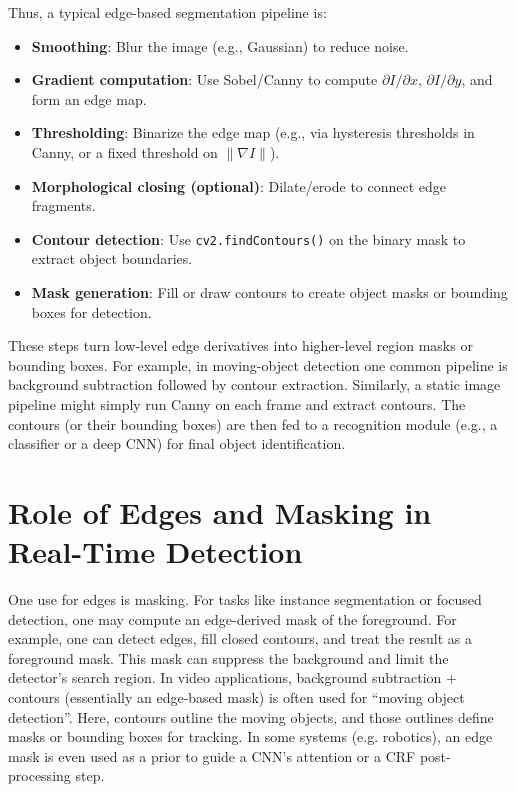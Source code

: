 \documentclass[12pt]{article}
\begin{document}
Thus, a typical edge-based segmentation pipeline is:
\begin{itemize}
\item \textbf{Smoothing}: Blur the image (e.g., Gaussian) to reduce noise.
\item \textbf{Gradient computation}: Use Sobel/Canny to compute $\partial I / \partial x$, $\partial I / \partial y$, and form an edge map.
\item \textbf{Thresholding}: Binarize the edge map (e.g., via hysteresis thresholds in Canny, or a fixed threshold on $\| \nabla I \|$).
\item \textbf{Morphological closing (optional)}: Dilate/erode to connect edge fragments.
\item \textbf{Contour detection}: Use \texttt{cv2.findContours()} on the binary mask to extract object boundaries.
\item \textbf{Mask generation}: Fill or draw contours to create object masks or bounding boxes for detection.
\end{itemize}

These steps turn low-level edge derivatives into higher-level region masks or bounding boxes. For example, in moving-object detection one common pipeline is background subtraction followed by contour extraction. Similarly, a static image pipeline might simply run Canny on each frame and extract contours. The contours (or their bounding boxes) are then fed to a recognition module (e.g., a classifier or a deep CNN) for final object identification.

\section{Role of Edges and Masking in Real-Time Detection}
One use for edges is masking. For tasks like instance segmentation or focused detection, one may compute an edge-derived mask of the foreground. For example, one can detect edges, fill closed contours, and treat the result as a foreground mask. This mask can suppress the background and limit the detector’s search region. In video applications, background subtraction + contours (essentially an edge-based mask) is often used for “moving object detection”. Here, contours outline the moving objects, and those outlines define masks or bounding boxes for tracking. In some systems (e.g. robotics), an edge mask is even used as a prior to guide a CNN’s attention or a CRF post-processing step.
\end{document}

